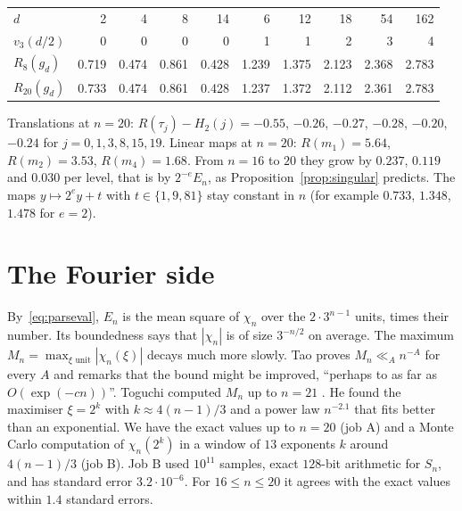 \documentclass[11pt]{article}
\theoremstyle{remark}
\begin{document}
\begin{center}
\begin{tabular}{@{}lrrrrrrrrr@{}}
\toprule
$d$ & 2 & 4 & 8 & 14 & 6 & 12 & 18 & 54 & 162\\
$v_3(d/2)$ & 0 & 0 & 0 & 0 & 1 & 1 & 2 & 3 & 4\\
\midrule
$R_8(g_d)$ & 0.719 & 0.474 & 0.861 & 0.428 & 1.239 & 1.375 & 2.123 & 2.368 & 2.783\\
$R_{20}(g_d)$ & 0.733 & 0.474 & 0.861 & 0.428 & 1.237 & 1.372 & 2.112 & 2.361 & 2.783\\
\bottomrule
\end{tabular}
\end{center}
Translations at $n=20$: $R(\tau_j)-H_2(j)=-0.55$, $-0.26$, $-0.27$, $-0.28$, $-0.20$, $-0.24$ for $j=0,1,3,8,15,19$. Linear maps at $n=20$: $R(m_1)=5.64$, $R(m_2)=3.53$, $R(m_4)=1.68$. From $n=16$ to $20$ they grow by $0.237$, $0.119$ and $0.030$ per level, that is by $2^{-e}E_n$, as Proposition~\ref{prop:singular} predicts. The maps $y\mapsto 2^ey+t$ with $t\in\{1,9,81\}$ stay constant in $n$ (for example $0.733$, $1.348$, $1.478$ for $e=2$).

\section{The Fourier side}
By~\eqref{eq:parseval}, $E_n$ is the mean square of $\chi_n$ over the $2\cdot3^{n-1}$ units, times their number. Its boundedness says that $|\chi_n|$ is of size $3^{-n/2}$ on average. The maximum $M_n=\max_{\xi\text{ unit}}|\chi_n(\xi)|$ decays much more slowly. Tao proves $M_n\ll_An^{-A}$ for every $A$ \cite[Prop.~1.17]{Tao} and remarks that the bound might be improved, ``perhaps to as far as $O(\exp(-cn))$''. Toguchi computed $M_n$ up to $n=21$ \cite{Toguchi}. He found the maximiser $\xi=2^k$ with $k\approx4(n-1)/3$ and a power law $n^{-2.1}$ that fits better than an exponential. We have the exact values up to $n=20$ (job A) and a Monte Carlo computation of $\chi_n(2^k)$ in a window of $13$ exponents $k$ around $4(n-1)/3$ (job B). Job B used $10^{11}$ samples, exact $128$-bit arithmetic for $S_n$, and has standard error $3.2\cdot10^{-6}$. For $16\le n\le20$ it agrees with the exact values within $1.4$ standard errors.
\end{document}
